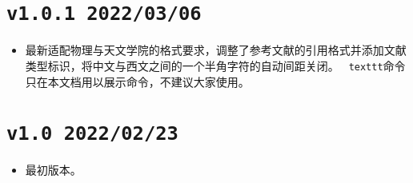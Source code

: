 \section*{\texttt{v1.0.1 2022/03/06}}
\begin{itemize}
    \item 最新适配物理与天文学院的格式要求，调整了参考文献的引用格式并添加文献类型标识，将中文与西文之间的一个半角字符的自动间距关闭。 \texttt{ texttt}命令只在本文档用以展示命令，不建议大家使用。
\end{itemize}

\section*{\texttt{v1.0 2022/02/23}}
\begin{itemize}
    \item 最初版本。
\end{itemize}